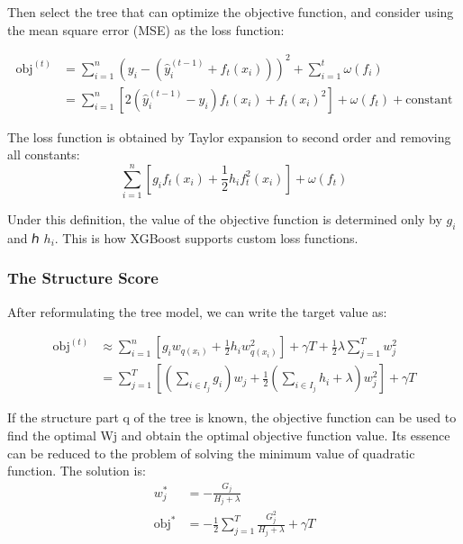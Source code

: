 \documentclass[12pt]{article}  %
\begin{document}
Then select the tree that can optimize the objective function, and consider using the mean square error (MSE) as the loss function:

\begin{equation}\label{eq:origin}
\begin{split}\text{obj}^{(t)} & = \sum_{i=1}^n (y_i - (\hat{y}_i^{(t-1)} + f_t(x_i)))^2 + \sum_{i=1}^t\omega(f_i) \\
          & = \sum_{i=1}^n [2(\hat{y}_i^{(t-1)} - y_i)f_t(x_i) + f_t(x_i)^2] + \omega(f_t) + \mathrm{constant}\end{split}
\end{equation}

The loss function is obtained by Taylor expansion to second order and removing all constants:
\begin{equation}
\sum_{i=1}^n [g_i f_t(x_i) + \frac{1}{2} h_i f_t^2(x_i)] + \omega(f_t)
\end{equation}

Under this definition, the value of the objective function is determined only by $g_i$ and ℎ $h_i$. This is how XGBoost supports custom loss functions.

\subsubsection{The Structure Score}
After reformulating the tree model, we can write the target value as:

\begin{equation}
\begin{split}\text{obj}^{(t)} &\approx \sum_{i=1}^n [g_i w_{q(x_i)} + \frac{1}{2} h_i w_{q(x_i)}^2] + \gamma T + \frac{1}{2}\lambda \sum_{j=1}^T w_j^2\\
&= \sum^T_{j=1} [(\sum_{i\in I_j} g_i) w_j + \frac{1}{2} (\sum_{i\in I_j} h_i + \lambda) w_j^2 ] + \gamma T\end{split}
\end{equation}

If the structure part q of the tree is known, the objective function can be used to find the optimal Wj and obtain the optimal objective function value. Its essence can be reduced to the problem of solving the minimum value of quadratic function. The solution is:
\begin{equation}
\begin{split}w_j^\ast &= -\frac{G_j}{H_j+\lambda}\\
\text{obj}^\ast &= -\frac{1}{2} \sum_{j=1}^T \frac{G_j^2}{H_j+\lambda} + \gamma T\end{split}
\end{equation}
\end{document}
